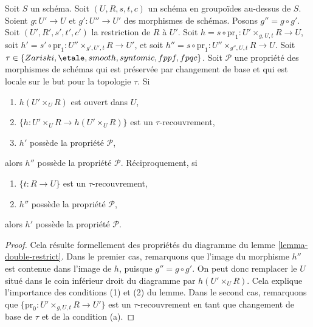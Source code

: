 \begin{lemma}
\label{lemma-double-restrict-property}
Soit $S$ un schéma.
Soit $(U, R, s, t, c)$ un schéma en groupoïdes au-dessus de $S$.
Soient $g : U' \to U$ et $g' : U'' \to U'$ des morphismes de schémas.
Posons $g'' = g \circ g'$.
Soit $(U', R', s', t', c')$ la restriction de $R$ à $U'$.
Soit $h = s \circ \text{pr}_1 : U' \times_{g, U, t} R \to U$,
soit $h' = s' \circ \text{pr}_1 : U'' \times_{g', U', t} R \to U'$, et
soit $h'' = s \circ \text{pr}_1 : U'' \times_{g'', U, t} R \to U$.
Soit $\tau \in \{Zariski, \linebreak[0] \etale, \linebreak[0]
smooth, \linebreak[0] syntomic, \linebreak[0] fppf, \linebreak[0] fpqc\}$. Soit
$\mathcal{P}$ une propriété des morphismes de schémas
qui est préservée par changement de base et qui
est locale sur le but pour la topologie $\tau$. Si
\begin{enumerate}
\item $h(U' \times_U R)$ est ouvert dans $U$,
\item $\{h : U' \times_U R \to h(U' \times_U R)\}$ est un $\tau$-recouvrement,
\item $h'$ possède la propriété $\mathcal{P}$,
\end{enumerate}
alors $h''$ possède la propriété $\mathcal{P}$. Réciproquement, si
\begin{enumerate}
\item[(a)] $\{t : R \to U\}$ est un $\tau$-recouvrement,
\item[(d)] $h''$ possède la propriété $\mathcal{P}$,
\end{enumerate}
alors $h'$ possède la propriété $\mathcal{P}$.
\end{lemma}

\begin{proof}
Cela résulte formellement des propriétés du diagramme du
lemme \ref{lemma-double-restrict}.
Dans le premier cas, remarquons que l'image du morphisme
$h''$ est contenue dans l'image de $h$, puisque $g'' = g \circ g'$.
On peut donc remplacer le $U$ situé dans le coin inférieur droit du
diagramme par $h(U' \times_U R)$. Cela explique l'importance des
conditions (1) et (2) du lemme. Dans le second cas, remarquons que
$\{\text{pr}_0 : U' \times_{g, U, t} R \to U'\}$ est un $\tau$-recouvrement
en tant que changement de base de $\tau$ et de la condition (a).
\end{proof}






